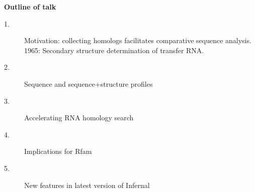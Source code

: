 \documentclass[landscape]{slides}
\begin{document}
\begin{slide}
\begin{center}
\textbf{Outline of talk}

\small
\begin{description}
\item[1.] Motivation: collecting homologs facilitates comparative
  sequence analysis.\\ 1965: Secondary structure determination of
  transfer RNA.
\item[2.] Sequence and sequence+structure profiles
\item[3.] Accelerating RNA homology search
\item[4.] Implications for Rfam
\item[5.] New features in latest version of Infernal
\end{description}

\end{center}
\vfill
\end{slide}
\begin{slide}
\end{slide}
\end{document}
